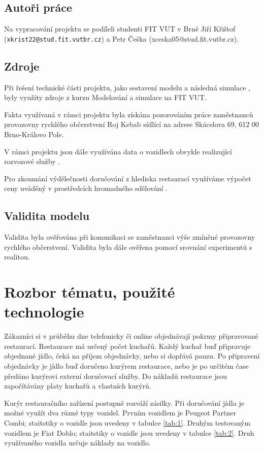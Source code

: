 \documentclass[a4paper, 11pt]{article}
\begin{document}
\subsection{Autoři práce}
Na vypracování projektu se podíleli studenti FIT VUT v Brně Jiří Křištof (\texttt{xkrist22@stud.fit.vutbr.cz}) a Petr Češka (xceska05@stud.fit.vutbr.cz). 

\subsection{Zdroje}
Při řešení technické části projektu, jako sestavení modelu \cite[snímek 7]{IMS_course} a následná simulace \cite[snímek 8]{IMS_course}, byly využity zdroje z kurzu Modelování a simulace na FIT VUT. 

Fakta využívaná v rámci projektu byla získána pozorováním práce zaměstnanců provozovny rychlého občerstvení Roj Kebab sídlící na adrese Skácelova 69, 612 00 Brno-Královo Pole.

V rámci projektu jsou dále využívána data o vozidlech obvykle realizující rozvozové služby \cite{car_peugeot, car_fiat}.

Pro zkoumání výdělečnosti doručování z hlediska restaurací využíváme výpočet ceny uváděný v prostředcích hromadného sdělování \cite{news}.

\subsection{Validita modelu}
Validita \cite[snímek 37]{IMS_course} byla ověřována při komunikaci se zaměstnanci výše zmíněné provozovny rychlého občerstvení. Validita byla dále ověřena pomocí srovnání experimentů \cite[snímek 9]{IMS_course} s realitou.

\section{Rozbor tématu, použité technologie}
Zákazníci si v průběhu dne telefonicky či online objednávají pokrmy připravované restaurací. Restaurace má určený počet kuchařů. Každý kuchař buď připravuje objednané jídlo, čeká na příjem objednávky, nebo si dopřává pauzu. Po připravení objednávky je jídlo buď doručeno kurýrem restaurace, nebo je po určitém čase předáno kurýrovi externí doručovací služby. Do nákladů restaurace jsou započítávány platy kuchařů a vlastních kurýrů.

Kurýr restauračního zařízení postupně rozváží zásilky. Při doručování jídla je možné využít dva různé typy vozidel. Prvním vozidlem je Peugeot Partner Combi; staitstiky o vozidle jsou uvedeny v tabulce \ref{tab:1}. Druhým testovaným vozidlem je Fiat Doblo; staitstiky o vozidle jsou uvedeny v tabulce \ref{tab:2}. Druh využívaného vozidla určuje náklady na vozidlo.
\end{document}
